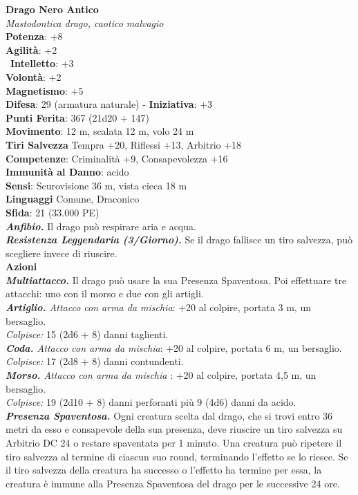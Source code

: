 \begin{multicols}{2}
\medskip\textbf{Drago Nero Antico}\\
\emph{Mastodontica drago, caotico malvagio}\\
\textbf{Potenza}: +8\\
\textbf{Agilità}: +2\\\
\textbf{Intelletto}: +3\\
\textbf{Volontà}: +2\\
\textbf{Magnetismo}: +5\\
\textbf{Difesa}: 29 (armatura naturale) - \textbf{Iniziativa}: +3\\
\textbf{Punti Ferita}: 367 (21d20 + 147)\\
\textbf{Movimento}: 12 m, scalata 12 m, volo 24 m\\
\textbf{Tiri Salvezza} Tempra +20, Riflessi +13, Arbitrio +18\\
\textbf{Competenze}: Criminalità +9, Consapevolezza +16\\
\textbf{Immunità al Danno}: acido\\
\textbf{Sensi}: Scurovisione 36 m, vista cieca 18 m\\
\textbf{Linguaggi} Comune, Draconico\\
\textbf{Sfida}: 21 (33.000 PE)\smallskip\\
\emph{\textbf{Anfibio.}} Il drago può respirare aria e acqua.\\
\emph{\textbf{Resistenza Leggendaria (3/Giorno).}} Se il drago fallisce un tiro salvezza, può scegliere invece di riuscire.\\
\smallskip\textbf{Azioni}\\
\emph{\textbf{Multiattacco.}} Il drago può usare la sua Presenza Spaventosa. Poi effettuare tre attacchi: uno con il morso e due con gli artigli.\\
\emph{\textbf{Artiglio.} Attacco con arma da mischia}: +20 al colpire, portata 3 m, un bersaglio.\\
\emph{Colpisce:} 15 (2d6 + 8) danni taglienti.\\
\emph{\textbf{Coda.} Attacco con arma da mischia}: +20 al colpire, portata 6 m, un bersaglio.\\
\emph{Colpisce:} 17 (2d8 + 8) danni contundenti.\\
\emph{\textbf{Morso.} Attacco con arma da mischia} : +20 al colpire, portata 4,5 m, un bersaglio.\\
\emph{Colpisce:} 19 (2d10 + 8) danni perforanti più 9 (4d6) danni da acido.\\
\emph{\textbf{Presenza Spaventosa.}} Ogni creatura scelta dal drago, che si trovi entro 36 metri da esso e consapevole della sua presenza, deve riuscire un tiro salvezza su Arbitrio DC  24 o restare spaventata per 1 minuto. Una creatura può ripetere il tiro salvezza al termine di ciascun suo round, terminando l'effetto se lo riesce. Se il tiro salvezza della creatura ha successo o l'effetto ha termine per essa, la creatura è immune alla Presenza Spaventosa del drago per le successive 24 ore.\\

\end{multicols}
